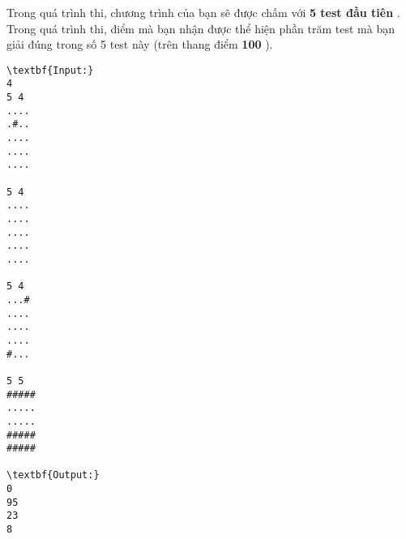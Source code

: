 Trong quá trình thi, chương trình của bạn sẽ được chấm với   \textbf{    5 test đầu tiên   }   . Trong quá trình thi, điểm mà bạn nhận được thể hiện phần trăm test mà bạn giải đúng trong số 5 test này (trên thang điểm   \textbf{    100   }   ).
\begin{verbatim}
\textbf{Input:}
4
5 4
....
.#..
....
....
....

5 4
....
....
....
....
....

5 4
...#
....
....
....
#...

5 5
#####
.....
.....
#####
#####

\textbf{Output:}
0
95
23
8
\end{verbatim}